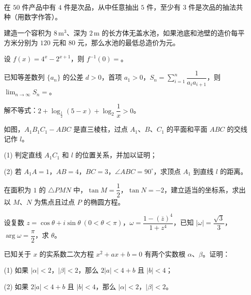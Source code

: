 \begin{question}
在 $50$ 件产品中有 $4$ 件是次品，从中任意抽出 $5$ 件，至少有 $3$ 件是次品的抽法共\underline{\qquad\qquad}种（用数字作答）。

\end{question}
\begin{question}
建造一个容积为 $8\,\mathrm m^3$、深为 $2\,\mathrm m$ 的长方体无盖水池，如果池底和池壁的造价每平方米分别为 $120$ 元和 $80$ 元，那么水池的最低总造价为\underline{\qquad\qquad}元。

\end{question}
\begin{question}
设 $f(x)=4^x-2^{x+1}$，则 $f^{-1}(0)=$\underline{\qquad\qquad}。

\end{question}
\begin{question}
已知等差数列 $\{a_n\}$ 的公差 $d>0$，首项 $a_1>0$，$S_n=\displaystyle\sum_{i=1}^{n}\dfrac1{a_i a_{i+1}}$，则 $\displaystyle\lim_{n\to\infty}S_n=$\underline{\qquad\qquad}。

\end{question}
\begin{question}
解不等式：$2+\log_{\frac12}(5-x)+\log_2\dfrac1x>0$。

\Needspace{0.4\textheight}
\end{question}
\begin{question}
如图，$A_1B_1C_1-ABC$ 是直三棱柱，过点 $A_1\text{、}B\text{、}C_1$ 的平面和平面 $ABC$ 的交线记作 $l$。

(1) 判定直线 $A_1C_1$ 和 $l$ 的位置关系，并加以证明；

(2) 若 $A_1A=1$，$AB=4$，$BC=3$，$\angle ABC=90^\circ$，求顶点 $A_1$ 到直线 $l$ 的距离。
\nopagebreak[4]
\begin{center}\end{center}
\nopagebreak[4]
\end{question}
\begin{question}
在面积为 $1$ 的 $\triangle PMN$ 中，$\tan M=\dfrac12$，$\tan N=-2$，建立适当的坐标系，求出以 $M\text{、}N$ 为焦点且过点 $P$ 的椭圆方程。

\end{question}
\begin{question}
设复数 $z=\cos\theta+i\sin\theta\ (0<\theta<\pi)$，$\omega=\dfrac{1-(\overline z)^4}{1+z^4}$，已知 $|\omega|=\dfrac{\sqrt3}{3}$，$\arg\omega=\dfrac\pi2$，求 $\theta$。

\end{question}
\begin{question}
已知关于 $x$ 的实系数二次方程 $x^2+ax+b=0$ 有两个实数根 $\alpha\text{、}\beta$。证明：

(1) 如果 $|\alpha|<2$，$|\beta|<2$，那么 $2|a|<4+b$ 且 $|b|<4$；

(2) 如果 $2|a|<4+b$ 且 $|b|<4$，那么 $|\alpha|<2$，$|\beta|<2$。

\end{question}
